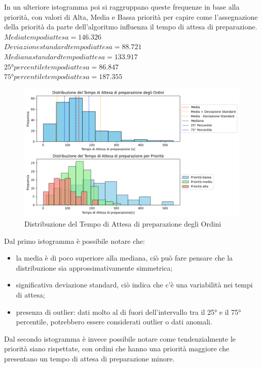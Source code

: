 In un ulteriore istogramma poi si raggruppano queste frequenze in base alla priorità, con valori di Alta, Media e Bassa priorità per capire come l'assegnazione della priorità da parte dell'algoritmo influenza il tempo di attesa di preparazione.\\
$Media tempo di attesa = 146.326$\\
$Deviazione standard tempo di attesa = 88.721$\\
$Mediana standard tempo di attesa = 133.917$\\
$25° percentile tempo di attesa = 86.847$\\
$75° percentile tempo di attesa = 187.355$
\begin{figure}[H]
	\centering
	\includegraphics[scale=0.6]{iterazione3/images/distr_t_attesa_prep.png}
	\caption{Distribuzione del Tempo di Attesa di preparazione degli Ordini\label{fig:distr_t_attesa_prep}}
\end{figure}
Dal primo istogramma è possibile notare che:
\begin{itemize}
	\item la media è di poco superiore alla mediana, ciò può fare pensare che la distribuzione sia approssimativamente simmetrica;
	\item significativa deviazione standard, ciò indica che c'è una variabilità nei tempi di attesa;
	\item presenza di outlier: dati molto al di fuori dell'intervallo tra il 25° e il 75° percentile, potrebbero essere considerati outlier o dati anomali.
\end{itemize}
Dal secondo istogramma è invece possibile notare come tendenzialmente le priorità siano rispettate, con ordini che hanno una priorità maggiore che presentano un tempo di attesa di preparazione minore.

